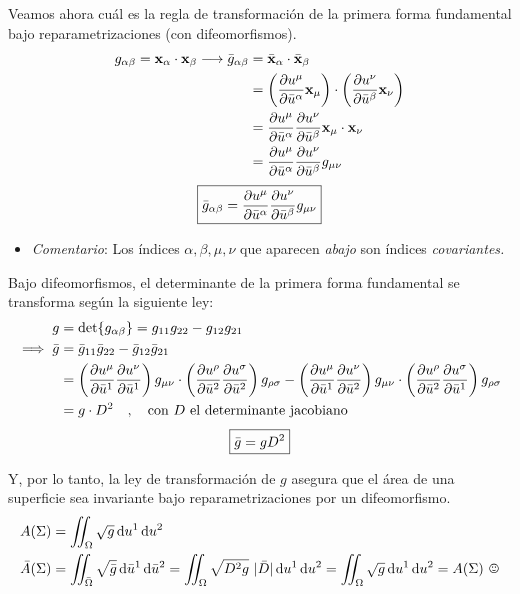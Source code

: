 Veamos ahora cuál es la regla de transformación de la primera forma fundamental bajo reparametrizaciones (con difeomorfismos).
\begin{align*}
    g_{\alpha \beta}      =\mathbf{x}_\alpha \cdot \mathbf{x}_\beta \longrightarrow    
    \Bar{g}_{\alpha \beta}&=\Bar{\mathbf{x}}_\alpha \cdot \Bar{\mathbf{x}}_\beta\\
                          &=\left ( \pdv{u^\mu}{\bar{u}^\alpha}\mathbf{x}_\mu  \right ) \cdot \left ( \pdv{u^\nu}{\bar{u}^\beta}\mathbf{x}_\nu  \right )\\
                          &=\pdv{u^\mu}{\bar{u}^\alpha} \pdv{u^\nu}{\bar{u}^\beta} \mathbf{x}_\mu \cdot \mathbf{x}_\nu\\
                          &=\pdv{u^\mu}{\bar{u}^\alpha} \pdv{u^\nu}{\bar{u}^\beta} g_{\mu \nu}
\end{align*}
$$
\boxed{\Bar{g}_{\alpha \beta}=\pdv{u^\mu}{\bar{u}^\alpha} \pdv{u^\nu}{\bar{u}^\beta} g_{\mu \nu}}
$$
\WFclear
\begin{itemize}
    \item \emph{Comentario}: Los índices $\alpha,\beta,\mu,\nu$ que aparecen \emph{abajo} son índices \emph{covariantes.} 
\end{itemize}

Bajo difeomorfismos, el determinante de la primera forma fundamental se transforma según la siguiente ley:
\begin{equation*}
    \begin{split}
        g&=\det{g_{\alpha \beta}} =g_{11}g_{22}-g_{12}g_{21}\\
\implies   \Bar{g}&=\Bar{g}_{11}\Bar{g}_{22}-\Bar{g}_{12}\Bar{g}_{21} \\
& =\left ( \pdv{u^\mu}{\bar{u}^1} \pdv{u^\nu}{\bar{u}^1} \right )g_{\mu \nu}\cdot \left ( \pdv{u^\rho}{\bar{u}^2} \pdv{u^\sigma}{\bar{u}^2} \right )g_{\rho \sigma} - \left ( \pdv{u^\mu}{\bar{u}^1} \pdv{u^\nu}{\bar{u}^2} \right )g_{\mu \nu}\cdot \left ( \pdv{u^\rho}{\bar{u}^2} \pdv{u^\sigma}{\bar{u}^1} \right )g_{\rho \sigma} \\
         &=g\cdot D^2 \quad , \quad \text{con $D$ el determinante jacobiano}
    \end{split}
\end{equation*}
$$
\boxed{\Bar{g}=gD^2}
$$

Y, por lo tanto, la ley de transformación de $g$ asegura que el área de una superficie sea invariante bajo reparametrizaciones por un difeomorfismo.
\begin{align*}
    A(\Sigma)      &=\int \! \! \! \! \int _\Omega \sqrt{g}\odif{u^1}\odif{u^2}\\
    \Bar{A}(\Sigma)&=\int \! \! \! \! \int _{\Bar{\Omega}} \sqrt{\Bar{g}} \odif{\Bar{u}^1} \odif{\Bar{u}^2} =\int \! \! \! \! \int _\Omega \sqrt{D^2 g}\ |\Bar{D}|\odif{u^1}\odif{u^2}=\int \! \! \! \! \int _\Omega \sqrt{g}\odif{u^1}\odif{u^2}=A(\Sigma) \ \smiley
\end{align*}

